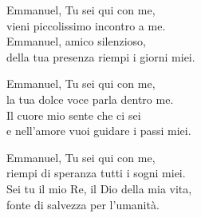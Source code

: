 
\strofa Emmanuel, Tu sei qui con me,\\
vieni piccolissimo incontro a me.\\
Emmanuel, amico silenzioso,\\
della tua presenza riempi i giorni miei.

\spazio


\spazio

\strofa Emmanuel, Tu sei qui con me,\\
la tua dolce voce parla dentro me.\\
Il cuore mio sente che ci sei\\
e nell'amore vuoi guidare i passi miei.

\spazio


\spazio

\strofa Emmanuel, Tu sei qui con me,\\
riempi di speranza tutti i sogni miei.\\
Sei tu il mio Re, il Dio della mia vita,\\
fonte di salvezza per l'umanità.

\spazio

